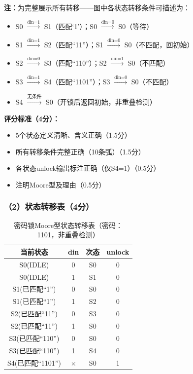\textbf{注：}为完整展示所有转移——图中各状态转移条件可描述为：
\begin{itemize}
  \item S0 $\xrightarrow{\text{din=1}}$ S1（匹配`1'）；S0 $\xrightarrow{\text{din=0}}$ S0（等待）
  \item S1 $\xrightarrow{\text{din=1}}$ S2（匹配``11''）；S1 $\xrightarrow{\text{din=0}}$ S0（不匹配，回初始）
  \item S2 $\xrightarrow{\text{din=0}}$ S3（匹配``110''）；S2 $\xrightarrow{\text{din=1}}$ S0（不匹配）
  \item S3 $\xrightarrow{\text{din=1}}$ S4（匹配``1101''）；S3 $\xrightarrow{\text{din=0}}$ S0（不匹配）
  \item S4 $\xrightarrow{\text{无条件}}$ S0（开锁后返回初始，非重叠检测）
\end{itemize}

\textbf{评分标准（4分）：}
\begin{itemize}
  \item 5个状态定义清晰、含义正确\hfill（1.5分）
  \item 所有转移条件完整正确（10条弧）\hfill（1.5分）
  \item 各状态unlock输出标注正确（仅S4=1）\hfill（0.5分）
  \item 注明Moore型及理由\hfill（0.5分）
\end{itemize}

\subsubsection*{（2）状态转移表（4分）}

\begin{table}[h]
\centering
\caption{密码锁Moore型状态转移表（密码：1101，非重叠检测）}
\begin{tabular}{|c|c|c|c|}
\hline
\textbf{当前状态} & \textbf{din} & \textbf{次态} & \textbf{unlock} \\
\hline
S0(IDLE) & 0 & S0 & 0 \\
S0(IDLE) & 1 & S1 & 0 \\
\hline
S1(已匹配``1'') & 0 & S0 & 0 \\
S1(已匹配``1'') & 1 & S2 & 0 \\
\hline
S2(已匹配``11'') & 0 & S3 & 0 \\
S2(已匹配``11'') & 1 & S0 & 0 \\
\hline
S3(已匹配``110'') & 0 & S0 & 0 \\
S3(已匹配``110'') & 1 & S4 & 0 \\
\hline
S4(已匹配``1101'') & $\times$ & S0 & 1 \\
\hline
\end{tabular}
\end{table}


